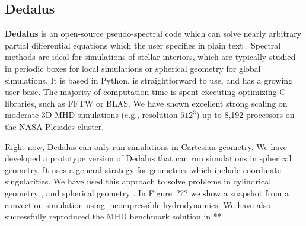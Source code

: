 {\color{purple}    
\subsection{Dedalus}}

\textbf{Dedalus} is an open-source pseudo-spectral code which can solve nearly arbitrary partial differential equations which the user specifies in plain text \citep[][source code at: dedalus-project.org]{Burns2016}. Spectral methods are ideal for simulations of stellar interiors, which are typically studied in periodic boxes for local simulations or spherical geometry for global simulations. It is based in Python, is straightforward to use, and has a growing user base. The majority of computation time is spent executing optimizing C libraries, such as FFTW or BLAS. We have shown excellent strong scaling on moderate 3D MHD simulations (e.g., resolution $512^3$) up to 8,192 processors on the NASA Pleiades cluster.

Right now, Dedalus can only run simulations in Cartesian geometry. We have developed a prototype version of Dedalus that can run simulations in spherical geometry. It uses a general strategy for geometries which include coordinate singularities. We have used this approach to solve problems in cylindrical geometry \cite{Vasil_2016}, and spherical geometry \citep[][submitted to JCP]{p}. In Figure~??? we show a snapshot from a convection simulation using incompressible hydrodynamics. We have also successfully reproduced the MHD benchmark solution in **


